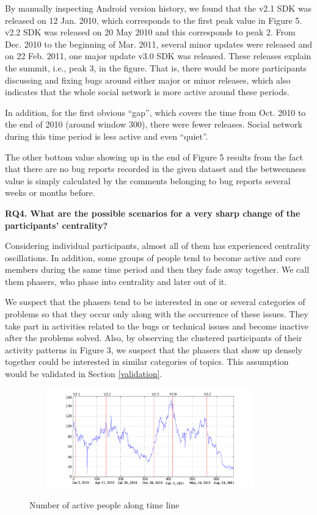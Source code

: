 \documentclass[10pt, conference, compsocconf]{IEEEtran}
\begin{document}
By manually inspecting Android version history, we found that the v2.1 SDK was released on 12 Jan. 2010, which corresponds to the first peak value in Figure 5. v2.2 SDK was released on 20 May 2010 and this corresponds to peak 2. From Dec. 2010 to the beginning of Mar. 2011, several minor updates were released and on 22 Feb. 2011, one major update v3.0 SDK was released. These releases explain the summit, i.e., peak 3, in the figure. That is, there would be more participants discussing and fixing bugs around either major or minor releases, which also indicates that the whole social network is more active around these periods.

In addition, for the first obvious  \textquotedblleft gap\textquotedblright, which covers the time from Oct. 2010 to the end of 2010 (around window 300), there were fewer releases. Social network during this time period is less active and even \textquotedblleft quiet\textquotedblright.

The other bottom value showing up in the end of Figure 5 results from the fact that there are no bug reports recorded in the given dataset and the betweenness value is simply calculated by the comments belonging to bug reports several weeks or months before. 

\textbf{RQ4. What are the possible scenarios for a very sharp change of the participants' centrality?}

Considering individual participants, almost all of them has experienced centrality oscillations. In addition, some groups of people tend to become active and core members during the same time period and then they fade away together. We call them phasers, who phase into centrality and later out of it.

We suspect that the phasers tend to be interested in one or several categories of problems so that they occur only along with the occurrence of these issues. They take part in activities related to the bugs or technical issues and become inactive after the problems solved. Also, by observing the clustered participants of their activity patterns in Figure 3, we suspect that the phasers that show up densely together could be interested in similar categories of topics. This assumption would be validated in Section \ref{validation}. 

\begin{figure}[!t]
\centerline{\includegraphics[width=4.1in, height = 4.3cm]{people.png}
\label{people}}
\caption{Number of active people along time line}
\end{figure}
\end{document}
